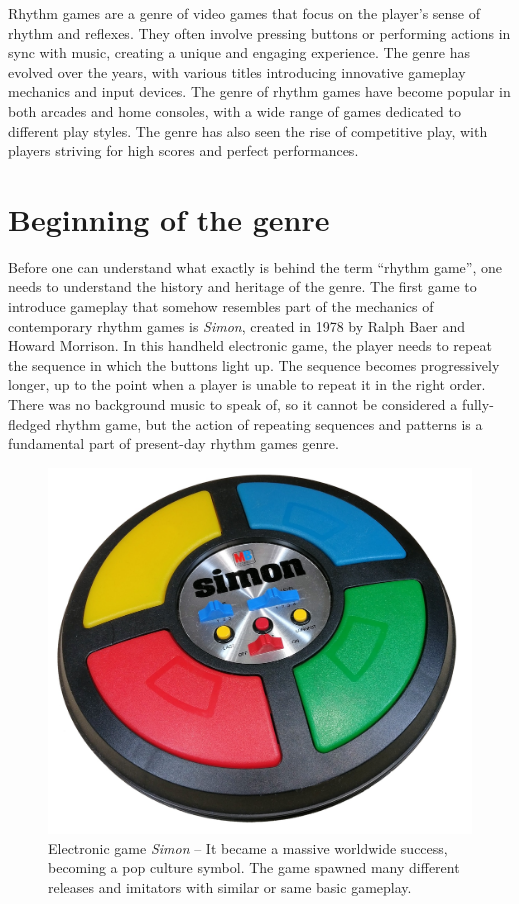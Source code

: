Rhythm games are a genre of video games that focus on the player’s sense of rhythm and reflexes. They often involve pressing buttons or performing actions in sync with music, creating a unique and engaging experience. The genre has evolved over the years, with various titles introducing innovative gameplay mechanics and input devices. The genre of rhythm games have become popular in both arcades and home consoles, with a wide range of games dedicated to different play styles. The genre has also seen the rise of competitive play, with players striving for high scores and perfect performances. 

\section{Beginning of the genre}
Before one can understand what exactly is behind the term ``rhythm game'', one needs to understand the history and heritage of the genre. The first game to introduce gameplay that somehow resembles part of the mechanics of contemporary rhythm games is \textit{Simon}, created in 1978 by Ralph Baer and Howard Morrison. In this handheld electronic game, the player needs to repeat the sequence in which the buttons light up. The sequence becomes progressively longer, up to the point when a player is unable to repeat it in the right order. There was no background music to speak of, so it cannot be considered a fully-fledged rhythm game, but the action of repeating sequences and patterns is a fundamental part of present-day rhythm games genre.

\begin{figure}[h]
    \centering\includegraphics[scale=0.1]{obrazki/simon.jpg}
    \caption{Electronic game \textit{Simon} -- It became a massive worldwide success, becoming a pop culture symbol. The game spawned many different releases and imitators with similar or same basic gameplay. \cite{simongame}}
    \label{fig:simon_game}
\end{figure}

